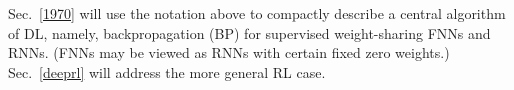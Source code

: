 \documentclass[letterpaper]{article}
\begin{document}
\begin{CJK*}{UTF8}{gbsn}
Sec.~\ref{1970} will use the notation above to compactly 
describe a central algorithm of DL, namely,
backpropagation (BP) for supervised weight-sharing FNNs and RNNs.
(FNNs may be viewed as RNNs with certain fixed zero weights.)
Sec.~\ref{deeprl} will address the more general RL case.






%
%
%
%
%
\end{CJK*}
\end{document}
